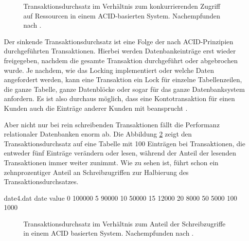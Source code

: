 \documentclass[12pt,oneside,a4paper,parskip]{scrbook}
\begin{document}
\begin{figure}
\begin{center}
\caption[Transaktionsdurchsatz im Verhältnis zum konkurrierenden Zugriff]{Transaktionsdurchsatz im Verhältnis zum konkurrierenden Zugriff auf Ressourcen in einem ACID-basierten System. Nachempfunden nach \cite{salt}.}
\label{salt}
\end{center}
\end{figure}
Der sinkende Transaktionsdurchsatz ist eine Folge der nach ACID-Prinzipien durchgeführten Transaktionen. Hierbei werden Datenbankeinträge erst wieder freigegeben, nachdem die gesamte Transaktion durchgeführt oder abgebrochen wurde. Je nachdem, wie das Locking implementiert oder welche Daten angefordert werden, kann eine Transaktion ein Lock für einzelne Tabellenzeilen, die ganze Tabelle, ganze Datenblöcke oder sogar für das ganze Datenbanksystem anfordern. Es ist also durchaus möglich, dass eine Kontotransaktion für einen Kunden auch die Einträge anderer Kunden mit beansprucht \cite{locking}\cite{dbarchitecture}.

Aber nicht nur bei rein schreibenden Transaktionen fällt die Performanz relationaler Datenbanken enorm ab. Die Abbildung \ref{salt2} zeigt den Transaktionsdurchsatz auf eine Tabelle mit 100 Einträgen bei Transaktionen, die entweder fünf Einträge verändern oder lesen, während der Anteil der lesenden Transaktionen immer weiter zunimmt. Wie zu sehen ist, führt schon ein zehnprozentiger Anteil an Schreibzugriffen zur Halbierung des Transaktionsdurchsatzes.
\begin{filecontents}{date4.dat}
date  value
0     100000
5     90000
10    50000
15    12000
20     8000
50     5000
100    1000
\end{filecontents}


\begin{figure}
\begin{center}
\caption[Transaktionsdurchsatz im Verhältnis zum Anteil der Schreibzugriffe]{Transaktionsdurchsatz im Verhältnis zum Anteil der Schreibzugriffe in einem ACID basierten System. Nachempfunden nach \cite{salt}.}
\label{salt2}
\end{center}
\end{figure}
\end{document}
